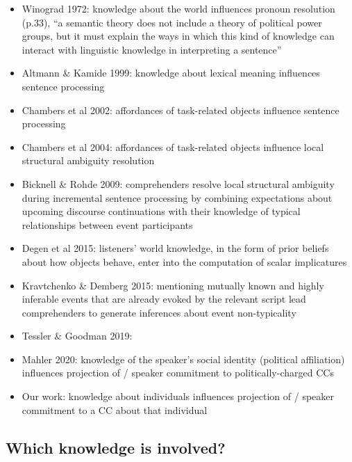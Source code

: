 \documentclass[11pt,fleqn]{article}
\newcommand{\6}{\mbox{$[\hspace*{-.6mm}[$}}
\newcommand{\9}{\mbox{$]\hspace*{-.6mm}]$}}
\begin{document}
\begin{itemize}

\item Winograd 1972: knowledge about the world influences pronoun resolution (p.33), ``a semantic theory does not include a theory of political power groups, but it must explain the ways in which this kind of knowledge can interact with linguistic knowledge in interpreting a sentence''

\item Altmann \& Kamide 1999: knowledge about lexical meaning influences sentence processing

\item Chambers et al 2002: affordances of task-related objects influence sentence processing

\item Chambers et al 2004: affordances of task-related objects influence local structural ambiguity resolution

\item Bicknell \& Rohde 2009: comprehenders resolve local structural ambiguity during incremental sentence processing by combining expectations about upcoming discourse continuations with their knowledge of typical relationships between event participants

\item Degen et al 2015: listeners' world knowledge, in the form of prior beliefs about how objects behave, enter into the computation of scalar implicatures

\item Kravtchenko \& Demberg 2015: mentioning mutually known and highly inferable events that are already evoked by the relevant script lead comprehenders to generate inferences about event non-typicality

\item Tessler \& Goodman 2019: 

\item Mahler 2020: knowledge of the speaker's social identity (political affiliation) influences projection of / speaker commitment to politically-charged CCs

\item Our work: knowledge about individuals influences projection of / speaker commitment to a CC about that individual

\end{itemize}

\subsection{Which knowledge is involved?}
\end{document}
